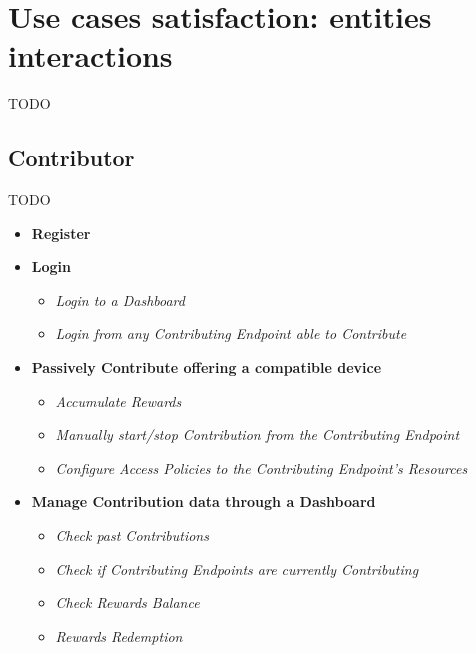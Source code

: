 \section{Use cases satisfaction: entities interactions}\label{use_cases_satisfaction}
TODO

\subsection{Contributor}
TODO

\begin{itemize}
    \item \textbf{Register}\\
    \item \textbf{Login}\\
    \begin{itemize}
        \item \textit{Login to a Dashboard}\\
        \item \textit{Login from any Contributing Endpoint able to Contribute}\\
    \end{itemize}
    \item \textbf{Passively Contribute offering a compatible device}\\
    \begin{itemize}
        \item \textit{Accumulate Rewards}\\
        \item \textit{Manually start/stop Contribution from the Contributing Endpoint}\\
        \item \textit{Configure Access Policies to the Contributing Endpoint's Resources}\\
    \end{itemize}
    \item \textbf{Manage Contribution data through a Dashboard}\\
    \begin{itemize}
        \item \textit{Check past Contributions}\\
        \item \textit{Check if Contributing Endpoints are currently Contributing}\\
        \item \textit{Check Rewards Balance}\\
        \item \textit{Rewards Redemption}\\
    \end{itemize}
\end{itemize}

